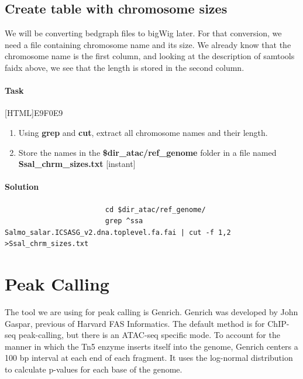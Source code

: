 \documentclass[12pt]{article}
\begin{document}
		\subsection{Create table with chromosome sizes}
			We will be converting bedgraph files to bigWig later. 
			For that conversion, we need a file containing chromosome name and its size. 
			We already know that the chromosome name is the first column, and looking at the description of samtools faidx above, we see that the length is stored in the second column.
			 
			\paragraph{Task}
			
			[HTML]{E9F0E9}{\parbox{\linewidth}{%
					\begin{enumerate}
						\item Using \textbf{grep} and \textbf{cut}, extract all chromosome names and their length.
						\item Store the names in the \textbf{\$dir\_atac/ref\_genome} folder in a file named \textbf{Ssal\_chrm\_sizes.txt} [instant]
					\end{enumerate}
			}}
			
			\paragraph{Solution}
			
				\begin{minipage}{\linewidth}
					\begin{lstlisting}
						cd $dir_atac/ref_genome/
						grep ^ssa Salmo_salar.ICSASG_v2.dna.toplevel.fa.fai | cut -f 1,2 >Ssal_chrm_sizes.txt
					\end{lstlisting}
				\end{minipage}
	
	\section{Peak Calling} 
		The tool we are using for peak calling is Genrich. Genrich was  developed by John Gaspar, previous of Harvard FAS Informatics. 
		The default method is for ChIP-seq peak-calling, but there is an ATAC-seq specific mode. 
		To account for the manner in which the Tn5 enzyme inserts itself into the genome, Genrich centers a 100 bp interval at each end of each fragment. 
		It uses the log-normal distribution to calculate p-values for each base of the genome.
		
\end{document}
